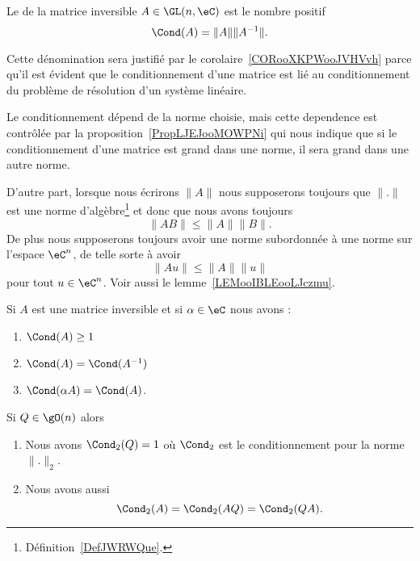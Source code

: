 \begin{definition}      \label{DEFooBKQWooJuoCGX}
    Le  de la matrice inversible \( A\in \GL(n,\eC)\) est le nombre positif
    \begin{equation}
        \Cond(A)=\| A \|\| A^{-1} \|.
    \end{equation}
\end{definition}

Cette dénomination sera justifié par le corolaire~\ref{CORooXKPWooJVHVvh} parce qu'il est évident que le conditionnement d'une matrice est lié au conditionnement du problème de résolution d'un système linéaire.

\begin{remark}
    Le conditionnement dépend de la norme choisie, mais cette dependence est contrôlée par la proposition~\ref{PropLJEJooMOWPNi} qui nous indique que si le conditionnement d'une matrice est grand dans une norme, il sera grand dans une autre norme.

    D'autre part, lorsque nous écrirons \( \| A \|\) nous supposerons toujours que \( \| . \|\) est une norme d'algèbre\footnote{Définition~\ref{DefJWRWQue}.} et donc que nous avons toujours
    \begin{equation}
        \| AB \|\leq \| A \|\| B \|.
    \end{equation}
    De plus nous supposerons toujours avoir une norme subordonnée à une norme sur l'espace \( \eC^n\), de telle sorte à avoir
    \begin{equation}
        \| Au \|\leq \| A \|\| u \|
    \end{equation}
    pour tout \( u\in\eC^n\). Voir aussi le lemme~\ref{LEMooIBLEooLJczmu}.
\end{remark}

\begin{proposition}
    Si \( A\) est une matrice inversible et si \( \alpha\in \eC\) nous avons :
    \begin{enumerate}
        \item
            \( \Cond(A)\geq 1\)
        \item
            \( \Cond(A)=\Cond(A^{-1})\)
        \item
            \( \Cond(\alpha A)=\Cond(A)\).
    \end{enumerate}
    Si \( Q\in\gO(n)\) alors
    \begin{enumerate}
        \item
            Nous avons \( \Cond_2(Q)=1\) où \( \Cond_2\) est le conditionnement pour la norme \( \| . \|_2\).
        \item
            Nous avons aussi
            \begin{equation}
                \Cond_2(A)=\Cond_2(AQ)=\Cond_2(QA).
            \end{equation}
    \end{enumerate}
\end{proposition}

